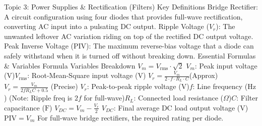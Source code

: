  Topic 3: Power Supplies & Rectification (Filters)
 Key Definitions
Bridge Rectifier: A circuit configuration using four diodes that provides full-wave rectification, converting AC input into a pulsating DC output.
Ripple Voltage ($V_r$): The unwanted leftover AC variation riding on top of the rectified DC output voltage.
Peak Inverse Voltage (PIV): The maximum reverse-bias voltage that a diode can safely withstand when it is turned off without breaking down.
 Essential Formulas & Variables
Formula Variables Breakdown
$V_m = V_{\text{rms}} \cdot \sqrt{2}$ $V_m$: Peak input voltage ($\text{V}$)$V_{\text{rms}}$: Root-Mean-Square input voltage ($\text{V}$)
$V_r = \frac{V_m}{2 \cdot f \cdot R_L \cdot C}$(Approx)$V_r = \frac{V_m}{2f R_L C + 0.5}$ (Precise) $V_r$: Peak-to-peak ripple voltage ($\text{V}$)$f$: Line frequency ($\text{Hz}$) (Note: Ripple freq is $2f$ for full-wave)$R_L$: Connected load resistance ($\Omega$)$C$: Filter capacitance ($\text{F}$)
$V_{DC} = V_m - \frac{V_r}{2}$ $V_{DC}$: Final average DC load output voltage ($\text{V}$)
$\text{PIV} = V_m$ For full-wave bridge rectifiers, the required rating per diode.
